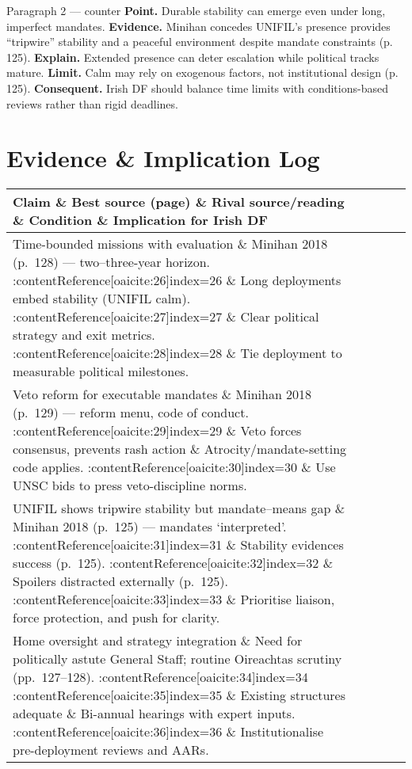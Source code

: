 Paragraph 2 — counter
\textbf{Point.} Durable stability can emerge even under long, imperfect mandates. \textbf{Evidence.} Minihan concedes UNIFIL’s presence provides “tripwire” stability and a peaceful environment despite mandate constraints (p. 125). \textbf{Explain.} Extended presence can deter escalation while political tracks mature. \textbf{Limit.} Calm may rely on exogenous factors, not institutional design (p. 125). \textbf{Consequent.} Irish DF should balance time limits with conditions-based reviews rather than rigid deadlines.

\section*{Evidence \& Implication Log}
\begin{tabular}{p{3.2cm}p{4.2cm}p{3.6cm}p{3.2cm}p{4.2cm}}
	\textbf{Claim} \& \textbf{Best source (page)} \& \textbf{Rival source/reading} \& \textbf{Condition} \& \textbf{Implication for Irish DF}\\\hline
	Time-bounded missions with evaluation \& Minihan 2018 (p.~128) — two–three-year horizon. :contentReference[oaicite:26]{index=26} \& Long deployments embed stability (UNIFIL calm). :contentReference[oaicite:27]{index=27} \& Clear political strategy and exit metrics. :contentReference[oaicite:28]{index=28} \& Tie deployment to measurable political milestones.\\
	Veto reform for executable mandates \& Minihan 2018 (p.~129) — reform menu, code of conduct. :contentReference[oaicite:29]{index=29} \& Veto forces consensus, prevents rash action \& Atrocity/mandate-setting code applies. :contentReference[oaicite:30]{index=30} \& Use UNSC bids to press veto-discipline norms.\\
	UNIFIL shows tripwire stability but mandate–means gap \& Minihan 2018 (p.~125) — mandates ‘interpreted’. :contentReference[oaicite:31]{index=31} \& Stability evidences success (p.~125). :contentReference[oaicite:32]{index=32} \& Spoilers distracted externally (p.~125). :contentReference[oaicite:33]{index=33} \& Prioritise liaison, force protection, and push for clarity.\\
	Home oversight and strategy integration \& Need for politically astute General Staff; routine Oireachtas scrutiny (pp.~127–128). :contentReference[oaicite:34]{index=34} :contentReference[oaicite:35]{index=35} \& Existing structures adequate \& Bi-annual hearings with expert inputs. :contentReference[oaicite:36]{index=36} \& Institutionalise pre-deployment reviews and AARs.\\
\end{tabular}

